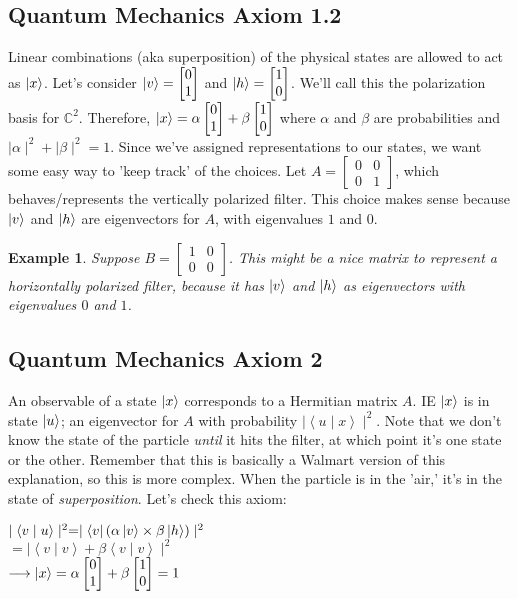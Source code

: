 \documentclass[12pt]{article}
\theoremstyle{plain}
\theoremstyle{nonumberplain}
\theoremstyle{plain}
\newtheorem{example}[lemma]{Example}
\theoremstyle{nonumberplain}
\newcommand\1{{\bf 1}}
\newcommand{\bmat}[1]{\begin{bmatrix*} #1 \end{bmatrix*}} %
\newcommand{\C}{\mathbb{C}} %
\newcommand{\<}{\left\langle}
\renewcommand{\>}{\right\rangle}
\newcommand{\inp}[2]{\left\langle#1\mid #2\right\rangle} %
\begin{document}
\subsection{Quantum Mechanics Axiom 1.2}
Linear combinations (aka superposition) of the physical states are allowed to act as $\ket{x}$. Let's consider $\ket{v}=\bmat{0 \\ 1}$ and $\ket{h}=\bmat{1 \\ 0}$. We'll call this the polarization basis for $\C^2$. Therefore, $\ket{x}=\alpha\bmat{0 \\ 1}+\beta\bmat{1 \\ 0}$ where $\alpha$ and $\beta$ are probabilities and $\mid\alpha\mid^2+\mid\beta\mid^2=1$. Since we've assigned representations to our states, we want some easy way to 'keep track' of the choices. Let $A=\bmat{0 & 0 \\ 0 & 1}$, which behaves/represents the vertically polarized filter. This choice makes sense because $\ket{v}$ and $\ket{h}$ are eigenvectors for $A$, with eigenvalues $1$ and $0$.
\begin{example}
Suppose $B=\bmat{1 & 0 \\ 0 & 0}$. This might be a nice matrix to represent a horizontally polarized filter, because it has $\ket{v}$ and $\ket{h}$ as eigenvectors with eigenvalues $0$ and $1$.
\end{example}


\subsection{Quantum Mechanics Axiom 2}
An observable of a state $\ket{x}$ corresponds to a Hermitian matrix $A$. IE $\ket{x}$ is in state $\ket{u}$; an eigenvector for $A$ with probability $\mid\inp{u}{x}\mid^2$. Note that we don't know the state of the particle \textit{until} it hits the filter, at which point it's one state or the other. Remember that this is basically a Walmart version of this explanation, so this is more complex. When the particle is in the 'air,' it's in the state of \textit{superposition}. Let's check this axiom: 
\begin{center}
$\mid\inp{v}{u}\mid^2=\mid\bra{v}(\alpha\ket{v}\times\beta\ket{h})\mid^2$ \\ 
$=\mid\inp{v}{v}+\beta\inp{v}{v}\mid^2$ \\
$\longrightarrow\ket{x}=\alpha\bmat{0 \\ 1}+\beta\bmat{1 \\ 0}=1$
\end{center}
\end{document}
